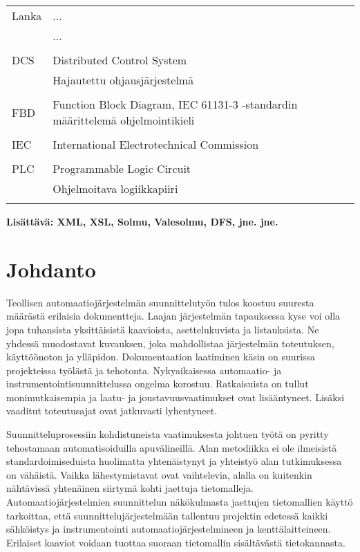 \documentclass[finnish,12pt]{article}
\begin{document}
	\begin{tabular}{ll}
Lanka        & ... \\
	     	      & ... \\ \\
	     	    
DCS        & Distributed Control System \\
        &   Hajautettu ohjausjärjestelmä \\ \\
        
FBD         & Function Block Diagram, IEC 61131-3 -standardin määrittelemä ohjelmointikieli\\\\
IEC          & International Electrotechnical Commission\\\\
PLC         & Programmable Logic Circuit \\
	      & Ohjelmoitava logiikkapiiri\\\\
	\end{tabular}

{\bf Lisättävä:
XML, XSL, Solmu, Valesolmu, DFS, jne. jne.
}


	\cleardoublepage
	\storeinipagenumber
	\setcounter{page}{1}


	\section{Johdanto}
	\thispagestyle{empty}

Teollisen automaatiojärjestelmän suunnittelutyön tulos koostuu suuresta määrästä erilaisia dokumentteja.
Laajan järjestelmän tapauksessa kyse voi olla jopa tuhansista yksittäisistä kaavioista, asettelukuvista ja listauksista.
Ne yhdessä muodostavat kuvauksen, joka mahdollistaa järjestelmän toteutuksen, käyttöönoton ja ylläpidon.
Dokumentaation laatiminen käsin on suurissa projekteissa työlästä ja tehotonta.
Nykyaikaisessa automaatio- ja instrumentointisuunnittelussa ongelma korostuu.
Ratkaisuista on tullut monimutkaisempia ja laatu- ja joustavuusvaatimukset ovat lisääntyneet.
Lisäksi vaaditut toteutusajat ovat jatkuvasti lyhentyneet.
\cite{RefWorks:41}

Suunnitteluprosessiin kohdistuneista vaatimuksesta johtuen työtä on pyritty tehostamaan automatisoiduilla apuvälineillä.
Alan metodiikka ei ole ilmeisistä standardoimiseduista huolimatta yhtenäistynyt ja yhteistyö alan tutkimuksessa on vähäistä.
Vaikka lähestymistavat ovat vaihtelevia, alalla on kuitenkin nähtävissä yhtenäinen siirtymä kohti jaettuja tietomalleja.
Automaatiojärjestelmien suunnittelun näkökulmasta jaettujen tietomallien käyttö tarkoittaa,
että suunnittelujärjestelmään tallentuu projektin edetessä kaikki sähköistys ja instrumentointi automaatiojärjestelmineen ja kenttälaitteineen.
Erilaiset kaaviot voidaan tuottaa suoraan tietomallin sisältävästä tietokannasta.
\end{document}
